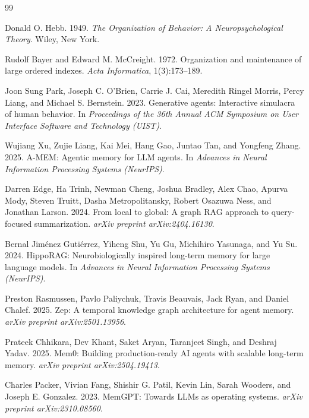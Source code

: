 \documentclass[11pt]{article}
\begin{document}
\begin{thebibliography}{99}

Donald O. Hebb. 1949.
\newblock \emph{The Organization of Behavior: A Neuropsychological Theory}.
\newblock Wiley, New York.

Rudolf Bayer and Edward M. McCreight. 1972.
\newblock Organization and maintenance of large ordered indexes.
\newblock \emph{Acta Informatica}, 1(3):173--189.

Joon Sung Park, Joseph C. O'Brien, Carrie J. Cai, Meredith Ringel Morris, Percy Liang, and Michael S. Bernstein. 2023.
\newblock Generative agents: Interactive simulacra of human behavior.
\newblock In \emph{Proceedings of the 36th Annual ACM Symposium on User Interface Software and Technology (UIST)}.

Wujiang Xu, Zujie Liang, Kai Mei, Hang Gao, Juntao Tan, and Yongfeng Zhang. 2025.
\newblock A-MEM: Agentic memory for LLM agents.
\newblock In \emph{Advances in Neural Information Processing Systems (NeurIPS)}.

Darren Edge, Ha Trinh, Newman Cheng, Joshua Bradley, Alex Chao, Apurva Mody, Steven Truitt, Dasha Metropolitansky, Robert Osazuwa Ness, and Jonathan Larson. 2024.
\newblock From local to global: A graph RAG approach to query-focused summarization.
\newblock \emph{arXiv preprint arXiv:2404.16130}.

Bernal Jim\'enez Guti\'errez, Yiheng Shu, Yu Gu, Michihiro Yasunaga, and Yu Su. 2024.
\newblock HippoRAG: Neurobiologically inspired long-term memory for large language models.
\newblock In \emph{Advances in Neural Information Processing Systems (NeurIPS)}.

Preston Rasmussen, Pavlo Paliychuk, Travis Beauvais, Jack Ryan, and Daniel Chalef. 2025.
\newblock Zep: A temporal knowledge graph architecture for agent memory.
\newblock \emph{arXiv preprint arXiv:2501.13956}.

Prateek Chhikara, Dev Khant, Saket Aryan, Taranjeet Singh, and Deshraj Yadav. 2025.
\newblock Mem0: Building production-ready AI agents with scalable long-term memory.
\newblock \emph{arXiv preprint arXiv:2504.19413}.

Charles Packer, Vivian Fang, Shishir G. Patil, Kevin Lin, Sarah Wooders, and Joseph E. Gonzalez. 2023.
\newblock MemGPT: Towards LLMs as operating systems.
\newblock \emph{arXiv preprint arXiv:2310.08560}.


\end{thebibliography}
\end{document}
